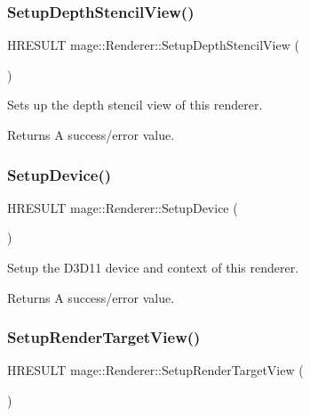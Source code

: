 \subsubsection{\texorpdfstring{Setup\+Depth\+Stencil\+View()}{SetupDepthStencilView()}}
{\footnotesize\ttfamily H\+R\+E\+S\+U\+LT mage\+::\+Renderer\+::\+Setup\+Depth\+Stencil\+View (\begin{DoxyParamCaption}{ }\end{DoxyParamCaption})\hspace{0.3cm}{\ttfamily [protected]}}

Sets up the depth stencil view of this renderer.

\begin{DoxyReturn}{Returns}
A success/error value. 
\end{DoxyReturn}
\hypertarget{classmage_1_1_renderer_a4ee0187fb63587a219798523fb8cb7a6}{}\label{classmage_1_1_renderer_a4ee0187fb63587a219798523fb8cb7a6} 
\subsubsection{\texorpdfstring{Setup\+Device()}{SetupDevice()}}
{\footnotesize\ttfamily H\+R\+E\+S\+U\+LT mage\+::\+Renderer\+::\+Setup\+Device (\begin{DoxyParamCaption}{ }\end{DoxyParamCaption})\hspace{0.3cm}{\ttfamily [protected]}}

Setup the D3\+D11 device and context of this renderer.

\begin{DoxyReturn}{Returns}
A success/error value. 
\end{DoxyReturn}
\hypertarget{classmage_1_1_renderer_afe99715a4ae6432ba561dcab048f79b4}{}\label{classmage_1_1_renderer_afe99715a4ae6432ba561dcab048f79b4} 
\subsubsection{\texorpdfstring{Setup\+Render\+Target\+View()}{SetupRenderTargetView()}}
{\footnotesize\ttfamily H\+R\+E\+S\+U\+LT mage\+::\+Renderer\+::\+Setup\+Render\+Target\+View (\begin{DoxyParamCaption}{ }\end{DoxyParamCaption})\hspace{0.3cm}{\ttfamily [protected]}}

